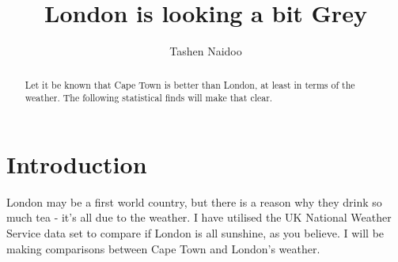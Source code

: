\documentclass[11pt,preprint, authoryear]{elsarticle}
\numberwithin{equation}{section}
\numberwithin{figure}{section}
\numberwithin{table}{section}
\begin{document}
\begin{frontmatter}  %

\title{London is looking a bit Grey}





\author[Add1]{Tashen Naidoo}





\address[Add1]{MCom Economics Student, Stellenbosch University, South
Africa}


\begin{abstract}
\small{
Let it be known that Cape Town is better than London, at least in terms
of the weather. The following statistical finds will make that clear.
}
\end{abstract}

\vspace{1cm}





\vspace{0.5cm}

\end{frontmatter}



\pagestyle{fancy}
\chead{}
\rhead{}
\lfoot{}
\lhead{}
\cfoot{}


\headsep 35pt %




\hypertarget{introduction}{%
\section{\texorpdfstring{Introduction
\label{Introduction}}{Introduction }}\label{introduction}}

London may be a first world country, but there is a reason why they
drink so much tea - it's all due to the weather. I have utilised the UK
National Weather Service data set to compare if London is all sunshine,
as you believe. I will be making comparisons between Cape Town and
London's weather.
\end{document}
